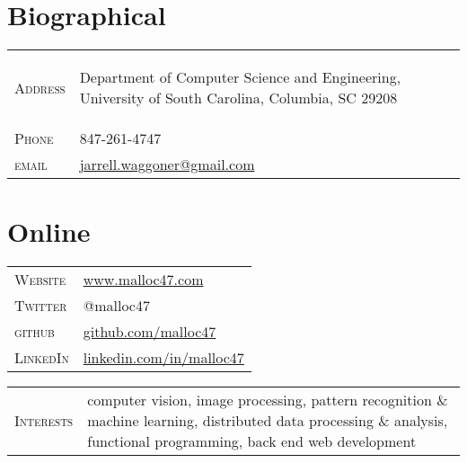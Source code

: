 \documentclass[10pt]{article}
\begin{document}
\pagestyle{empty}

\par{\bigskip\par}

\begin{multicols}{2}
\setlength{\parskip}{0pt}
\section{Biographical}
\begin{tabular}{l p{5.2cm}}
  \textsc{Address}	& \begin{footnotesize} Department of Computer Science and Engineering, University of South Carolina, Columbia, SC 29208 \end{footnotesize} \\
  \textsc{Phone}       & 847-261-4747\\
  \textsc{email}       & \href{mailto:jarrell.waggoner@gmail.com}{jarrell.waggoner@gmail.com} \\
\end{tabular}

\vfill
\columnbreak

\section{Online}
\begin{tabular}{l p{5cm}}
  \textsc{Website}	& \href{http://www.malloc47.com}{www.malloc47.com} \\
  \textsc{Twitter}     & @malloc47 \\
  \textsc{github}      & \href{http://www.github.com/malloc47}{github.com/malloc47}\\
  \textsc{LinkedIn}    & \href{http://www.linkedin.com/in/malloc47}{linkedin.com/in/malloc47} \\
\end{tabular}

\end{multicols}

\begin{tabularx}{\textwidth}{l X}
  \textsc{Interests} & computer vision, image processing, pattern
  recognition \& machine learning, distributed data processing \&
  analysis, functional programming, back end web development
\end{tabularx}
\end{document}
